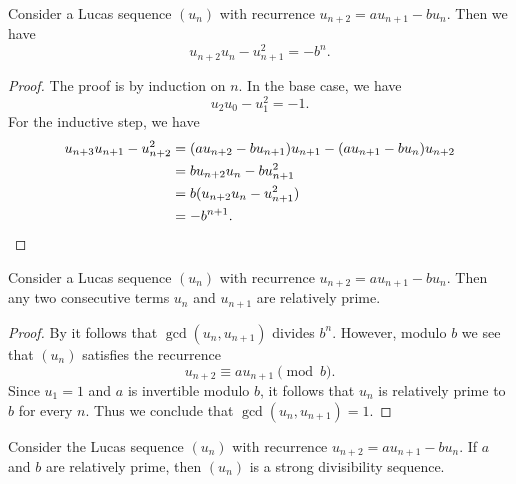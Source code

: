 \begin{proposition}\label{lemma:cassinis-identity}
  Consider a Lucas sequence $(u_n)$ with recurrence $u_{n+2}=au_{n+1}-bu_n$. Then we have
  \begin{equation*}
    u_{n+2}u_n-u_{n+1}^2=-b^{n}.
  \end{equation*}
\end{proposition}

\begin{proof}
  The proof is by induction on $n$. In the base case, we have
  \begin{equation*}
    u_{2}u_0-u_{1}^2=-1.
  \end{equation*}
  For the inductive step, we have
  \begin{align*}
    u_{n+3}u_{n+1}-u_{n+2}^2
    & = (au_{n+2}-bu_{n+1})u_{n+1}-(au_{n+1}-bu_n)u_{n+2} \\
    & = bu_{n+2}u_n-bu_{n+1}^2 \\
    & = b(u_{n+2}u_n-u_{n+1}^2) \\
    & = -b^{n+1}.\qedhere
  \end{align*}
\end{proof}

\begin{corollary}
  Consider a Lucas sequence $(u_n)$ with recurrence $u_{n+2}=au_{n+1}-bu_n$. Then any two consecutive terms $u_n$ and $u_{n+1}$ are relatively prime.
\end{corollary}

\begin{proof}
  By  it follows that $\gcd(u_n,u_{n+1})$ divides $b^n$. However, modulo $b$ we see that $(u_n)$ satisfies the recurrence
  \begin{equation*}
    u_{n+2}\equiv a u_{n+1}\pmod{b}.
  \end{equation*}
  Since $u_1=1$ and $a$ is invertible modulo $b$, it follows that $u_n$ is relatively prime to $b$ for every $n$. Thus we conclude that $\gcd(u_n,u_{n+1})=1$.
\end{proof}

\begin{theorem}\label{theorem:strong-divisibility-lucas-sequences}
  Consider the Lucas sequence $(u_n)$ with recurrence $u_{n+2}=au_{n+1}-bu_n$. If $a$ and $b$ are relatively prime, then $(u_n)$ is a strong divisibility sequence.
\end{theorem}


